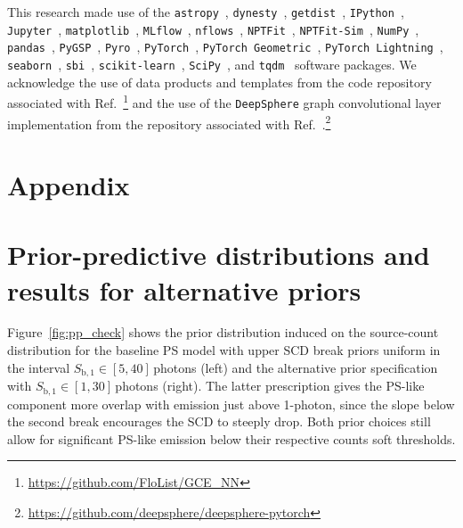 \documentclass[prd,aps,10pt,nofootinbib,twocolumn,superscriptaddress,preprintnumbers,balancelastpage,longbibliography,floatfix]{revtex4-2}
\begin{document}
\begin{acknowledgments}
This research made use of the \texttt{astropy}~\cite{Price-Whelan:2018hus,Robitaille:2013mpa}, \texttt{dynesty}~\cite{Speagle_2020}, \texttt{getdist}~\cite{Lewis:2019xzd}, \texttt{IPython}~\cite{PER-GRA:2007}, \texttt{Jupyter}~\cite{Kluyver2016JupyterN}, \texttt{matplotlib}~\cite{Hunter:2007}, \texttt{MLflow}~\cite{10.1145/3399579.3399867}, \texttt{nflows}~\cite{nflows}, \texttt{NPTFit}~\cite{Mishra-Sharma:2016gis}, \texttt{NPTFit-Sim}~\cite{NPTFit-Sim}, \texttt{NumPy}~\cite{harris2020array}, \texttt{pandas}~\cite{pandas:2010}, \texttt{PyGSP}~\cite{michael_defferrard_2017_1003158}, \texttt{Pyro}~\cite{bingham2019pyro}, \texttt{PyTorch}~\cite{NEURIPS2019_9015}, \texttt{PyTorch Geometric}~\cite{Fey/Lenssen/2019}, \texttt{PyTorch Lightning}~\cite{william_falcon_2020_3828935}, \texttt{seaborn}~\cite{seaborn}, \texttt{sbi}~\cite{tejero-cantero2020sbi}, \texttt{scikit-learn}~\cite{JMLR:v12:pedregosa11a}, \texttt{SciPy}~\cite{2020SciPy-NMeth}, and \texttt{tqdm}~\cite{casper_da_costa_luis_2021_5517697} software packages. We acknowledge the use of data products and templates from the code repository associated with Ref.~\cite{List:2020mzd}\footnote{\url{https://github.com/FloList/GCE_NN}} and the use of the \texttt{DeepSphere} graph convolutional layer implementation from the repository associated with Ref.~\cite{DBLP:conf/iclr/DefferrardMGP20}.\footnote{\url{https://github.com/deepsphere/deepsphere-pytorch}}
\end{acknowledgments}




\vspace{.2cm}

\appendix
\section*{Appendix}

\section{Prior-predictive distributions and results for alternative priors}
\label{app:priors}

Figure~\ref{fig:pp_check} shows the prior distribution induced on the source-count distribution for the baseline PS model with upper SCD break priors uniform in the interval $S_{\mathrm{b}, 1}  \in  [5, 40]$\,photons (left) and the alternative prior specification with $S_{\mathrm{b}, 1}  \in  [1, 30]$\,photons (right). The latter prescription gives the PS-like component more overlap with emission just above 1-photon, since the slope below the second break encourages the SCD to steeply drop. Both prior choices still allow for significant PS-like emission below their respective counts soft thresholds.
\end{document}
